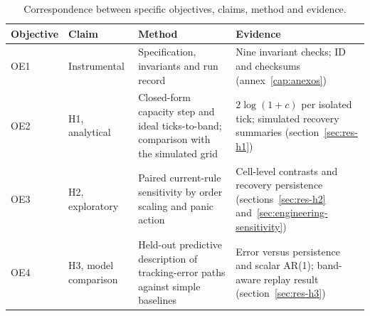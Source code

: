 \begin{table}[H]
\centering
\caption{Correspondence between specific objectives, claims, method and evidence.}
\label{tab:oe-h}
\footnotesize
\setlength{\tabcolsep}{3pt}
\renewcommand{\arraystretch}{1.0}
\begin{tabularx}{\textwidth}{@{}l l >{\raggedright\arraybackslash}X >{\raggedright\arraybackslash}X@{}}
\toprule
Objective & Claim & Method & Evidence \\
\midrule
OE1 & Instrumental & Specification, invariants and run record & Nine invariant checks; ID and checksums (annex~\ref{cap:anexos}) \\
OE2 & H1, analytical & Closed-form capacity step and ideal ticks-to-band; comparison with the simulated grid & $2\log(1+c)$ per isolated tick; simulated recovery summaries (section~\ref{sec:res-h1}) \\
OE3 & H2, exploratory & Paired current-rule sensitivity by order scaling and panic action & Cell-level contrasts and recovery persistence (sections~\ref{sec:res-h2} and~\ref{sec:engineering-sensitivity}) \\
OE4 & H3, model comparison & Held-out predictive description of tracking-error paths against simple baselines & Error versus persistence and scalar AR(1); band-aware replay result (section~\ref{sec:res-h3}) \\
\bottomrule
\end{tabularx}
\end{table}
